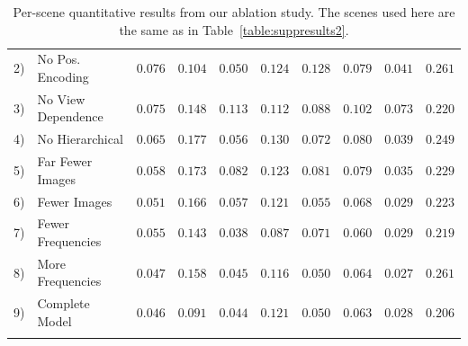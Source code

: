 \documentclass[runningheads]{llncs}
\newcommand{\mbf}[1]{{\mathbf{#1}}}
\begin{document}
\begin{table}[t]
{\begin{tabular}{ll|cccccccc}
2) & No Pos. Encoding          &      $0.076$  &      $0.104$  &      $0.050$  &      $0.124$  &      $0.128$  &      $0.079$  &      $0.041$  &      $0.261$  \\
3) & No View Dependence        &      $0.075$  &      $0.148$  &      $0.113$  &      $0.112$  &      $0.088$  &      $0.102$  &      $0.073$  &      $0.220$  \\
4) & No Hierarchical           &      $0.065$  &      $0.177$  &      $0.056$  &      $0.130$  &      $0.072$  &      $0.080$  &      $0.039$  &      $0.249$  \\
\arrayrulecolor{gray}
\hline
\arrayrulecolor{black}
5) & Far Fewer Images          &      $0.058$  &      $0.173$  &      $0.082$  &      $0.123$  &      $0.081$  &      $0.079$  &      $0.035$  &      $0.229$  \\
6) & Fewer Images              &      $0.051$  &      $0.166$  &      $0.057$  &      $0.121$  &      $0.055$  &      $0.068$  &      $0.029$  &      $0.223$  \\
\arrayrulecolor{gray}
\hline
\arrayrulecolor{black}
7) & Fewer Frequencies         &      $0.055$  &      $0.143$  & $\mbf{0.038}$ & $\mbf{0.087}$ &      $0.071$  & $\mbf{0.060}$ &      $0.029$  &      $0.219$  \\
8) & More Frequencies          &      $0.047$  &      $0.158$  &      $0.045$  &      $0.116$  &      $0.050$  &      $0.064$  & $\mbf{0.027}$ &      $0.261$  \\
\arrayrulecolor{gray}
\hline
\arrayrulecolor{black}
9) & Complete Model            & $\mbf{0.046}$ & $\mbf{0.091}$ &      $0.044$  &      $0.121$  & $\mbf{0.050}$ &      $0.063$  &      $0.028$  & $\mbf{0.206}$  \\
\hline
\multicolumn{9}{c}{}
\end{tabular}
} \vspace{2mm}
\caption{Per-scene quantitative results from our ablation study. The scenes used here are the same as in Table~\ref{table:suppresults2}.
}
\label{table:suppresultsabl} 
\end{table}
\setlength{\tabcolsep}{1.4pt}

\end{document}
